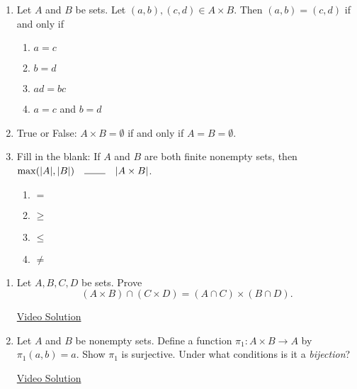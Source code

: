 \pagestyle{empty}


\begin{enumerate}
	\item Let $A$ and $B$ be sets. Let $(a,b),(c,d)\in A\times B$. Then $(a,b)=(c,d)$ if and only if 
    \begin{enumerate}
			\item $a=c$
			\item $b=d$
			\item $ad=bc$
			\item $a=c$ and $b=d$
    \end{enumerate}
    
  \item True or False: $A\times B =\emptyset$ if and only if $A=B=\emptyset$.
    
  \item Fill in the blank: If $A$ and $B$ are both finite nonempty sets, then $\max(|A|,|B|)\quad \rule{0.75cm}{0.15mm} \quad |A \times B|$.
  \begin{enumerate}
    \item $=$
    \item $\ge$
    \item $\le$
    \item $\neq$
  \end{enumerate}
\end{enumerate}



\begin{enumerate}
	\item Let $A,B,C,D$ be sets. Prove
	\[
		(A\times B)\cap (C\times D)=(A\cap C)\times (B\cap D).
	\]

	\href{https://youtu.be/TpjjI0dCfok}{Video Solution}

	\item Let $A$ and $B$ be nonempty sets. Define a function $\pi_1:A\times B\to A$ by $\pi_1(a,b)=a$. Show $\pi_1$ is surjective. Under what conditions is it a \emph{bijection}?

	\href{https://youtu.be/qIhugCqylC0}{Video Solution}
\end{enumerate}

